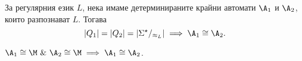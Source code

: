\begin{framed}
  \begin{corollary}\label{cor:regular:minimal-isomorphic}
    За регулярния език $L$, нека имаме детерминираните крайни автомати $\A_1$ и $\A_2$, които разпознават $L$. Тогава
    \[|Q_1| = |Q_2| = |\Sigma^\star/_{\approx_L}| \implies \A_1 \cong \A_2.\]
  \end{corollary}
\end{framed}
\begin{hint}
  $\A_1 \cong \M\ \&\ \A_2 \cong \M \implies \A_1 \cong \A_2$.
\end{hint}



